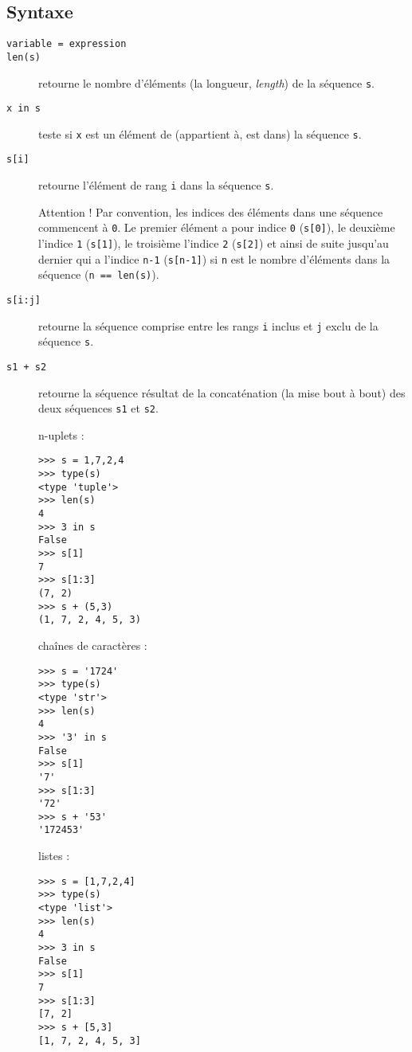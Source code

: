 \subsection{Syntaxe \python}\label{affectation:textes:python}
\begin{description}
\item[\texttt{variable = expression}]\mbox{}
\item[\texttt{len(s)}] retourne le nombre d'éléments (la longueur, \emph{length}) de la séquence \texttt{s}.
\item[\texttt{x in s}] teste si \texttt{x} est un élément de (appartient à, est dans) la séquence \texttt{s}.
\item[\texttt{s[i]}] retourne l'élément de rang \texttt{i} dans la séquence \texttt{s}.

	Attention ! Par convention, les indices des éléments dans une séquence commencent à {\tt 0}.
	Le premier élément a pour indice {\tt 0} ({\tt s[0]}), le deuxième l'indice {\tt 1}
	({\tt s[1]}), le troisième l'indice {\tt 2} ({\tt s[2]}) et ainsi de suite jusqu'au 
	dernier qui a l'indice {\tt n-1} ({\tt s[n-1]}) si {\tt n} est le nombre d'éléments 
	dans la séquence ({\tt n == len(s)}).
\item[\texttt{s[i:j]}] retourne la séquence comprise entre les rangs \texttt{i} inclus et 
	\texttt{j} exclu de la séquence \texttt{s}.
\item[\texttt{s1 + s2}] retourne la séquence résultat de la concaténation (la mise bout à bout) des 
	deux séquences \texttt{s1} et \texttt{s2}.

\begin{minipage}[t]{4cm}
n-uplets :\footnotesize
\begin{Verbatim}
>>> s = 1,7,2,4
>>> type(s)
<type 'tuple'>
>>> len(s)
4
>>> 3 in s
False
>>> s[1]
7
>>> s[1:3]
(7, 2)
>>> s + (5,3)
(1, 7, 2, 4, 5, 3)
\end{Verbatim}
\end{minipage}
\hfill
\begin{minipage}[t]{4cm}
chaînes de caractères :\footnotesize
\begin{Verbatim}
>>> s = '1724'
>>> type(s)
<type 'str'>
>>> len(s)
4
>>> '3' in s
False
>>> s[1]
'7'
>>> s[1:3]
'72'
>>> s + '53'
'172453'
\end{Verbatim}
\end{minipage}
\hfill
\begin{minipage}[t]{4cm}
listes :\footnotesize
\begin{Verbatim}
>>> s = [1,7,2,4]
>>> type(s)
<type 'list'>
>>> len(s)
4
>>> 3 in s
False
>>> s[1]
7
>>> s[1:3]
[7, 2]
>>> s + [5,3]
[1, 7, 2, 4, 5, 3]
\end{Verbatim}
\end{minipage}

\end{description}


